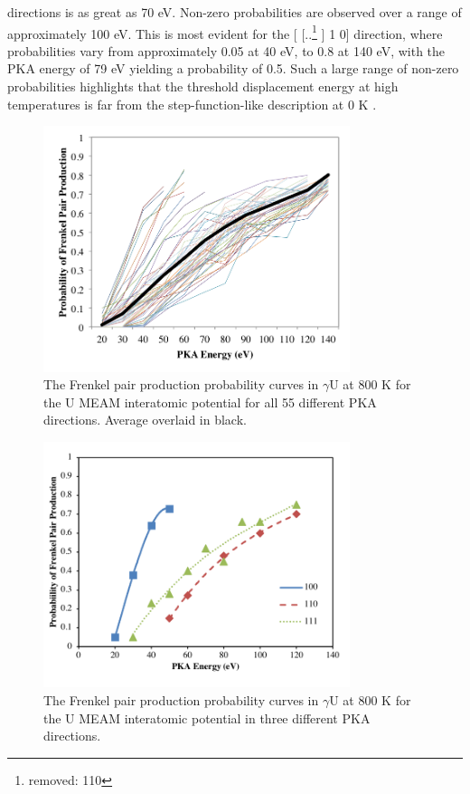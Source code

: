 \documentclass[review]{elsarticle}
\providecommand{\DIFaddtex}[1]{{\protect\color{blue} \sf #1}} %
\providecommand{\DIFdeltex}[1]{{\protect\color{red} [..\footnote{removed: #1} ]}} %
\providecommand{\DIFaddbegin}{} %
\providecommand{\DIFaddend}{} %
\providecommand{\DIFdelbegin}{} %
\providecommand{\DIFdelend}{} %
\providecommand{\DIFaddbeginFL}{} %
\providecommand{\DIFaddendFL}{} %
\providecommand{\DIFdelbeginFL}{} %
\providecommand{\DIFdelendFL}{} %
\providecommand{\DIFadd}[1]{\texorpdfstring{\DIFaddtex{#1}}{#1}} %
\providecommand{\DIFdel}[1]{\texorpdfstring{\DIFdeltex{#1}}{}} %
\newcommand{\DIFscaledelfig}{0.5}
\newlength{\DIFdelgraphicswidth} %
\newlength{\DIFdelgraphicsheight} %
\newcommand{\DIFaddincludegraphics}[2][]{{\color{blue}\fbox{\DIFOincludegraphics[#1]{#2}}}} %
\newcommand{\DIFdelincludegraphics}[2][]{%
\sbox{\DIFdelgraphicsbox}{\DIFOincludegraphics[#1]{#2}}%
\settoboxwidth{\DIFdelgraphicswidth}{\DIFdelgraphicsbox} %
\settoboxtotalheight{\DIFdelgraphicsheight}{\DIFdelgraphicsbox} %
\scalebox{\DIFscaledelfig}{%
\parbox[b]{\DIFdelgraphicswidth}{\usebox{\DIFdelgraphicsbox}\\[-\baselineskip] \rule{\DIFdelgraphicswidth}{0em}}\llap{\resizebox{\DIFdelgraphicswidth}{\DIFdelgraphicsheight}{%
\setlength{\unitlength}{\DIFdelgraphicswidth}%
\begin{picture}(1,1)%
\thicklines\linethickness{2pt} %
{\color[rgb]{1,0,0}\put(0,0){\framebox(1,1){}}}%
{\color[rgb]{1,0,0}\put(0,0){\line( 1,1){1}}}%
{\color[rgb]{1,0,0}\put(0,1){\line(1,-1){1}}}%
\end{picture}%
}\hspace*{3pt}}} %
} %
\DeclareRobustCommand{\DIFaddbegin}{\DIFOaddbegin \let\includegraphics\DIFaddincludegraphics} %
\DeclareRobustCommand{\DIFaddend}{\DIFOaddend \let\includegraphics\DIFOincludegraphics} %
\DeclareRobustCommand{\DIFdelbegin}{\DIFOdelbegin \let\includegraphics\DIFdelincludegraphics} %
\DeclareRobustCommand{\DIFdelend}{\DIFOaddend \let\includegraphics\DIFOincludegraphics} %
\DeclareRobustCommand{\DIFaddbeginFL}{\DIFOaddbeginFL \let\includegraphics\DIFaddincludegraphics} %
\DeclareRobustCommand{\DIFaddendFL}{\DIFOaddendFL \let\includegraphics\DIFOincludegraphics} %
\DeclareRobustCommand{\DIFdelbeginFL}{\DIFOdelbeginFL \let\includegraphics\DIFdelincludegraphics} %
\DeclareRobustCommand{\DIFdelendFL}{\DIFOaddendFL \let\includegraphics\DIFOincludegraphics} %
\begin{document}
directions is as great as 70 eV. Non-zero probabilities are observed over a range of approximately 100 eV. This is most evident for the [\DIFdelbegin \DIFdel{110}\DIFdelend \DIFaddbegin \DIFadd{1 1 0}\DIFaddend ] direction, where probabilities vary from approximately 0.05 at 40 eV, to 0.8 at 140 eV, with the PKA energy of 79 eV yielding a probability of 0.5. Such a large range of non-zero probabilities highlights that the \DIFaddbegin \DIFadd{threshold }\DIFaddend displacement energy at high temperatures is far from the step-function-like description at 0 K \cite{was2007}.

 \begin{figure}[h]
 \centering
 \includegraphics[width=0.8\textwidth]{ed_dir_allC.png} 
 \caption{The Frenkel pair production probability curves in $\gamma$U at 800 K for the U MEAM interatomic potential for all 55 different PKA directions. Average overlaid in black.}
 \label{fig:ed_dirall}
\end{figure}

\begin{figure}[h]
 \centering
 \DIFdelbeginFL %
\DIFdelendFL \DIFaddbeginFL \includegraphics[width=0.8\textwidth]{ed_dirBrev.png} 
 \DIFaddendFL \caption{The Frenkel pair production probability curves in $\gamma$U at 800 K for the U MEAM interatomic potential in three different PKA directions.}
 \label{fig:ed_dir}
\end{figure}
\end{document}
